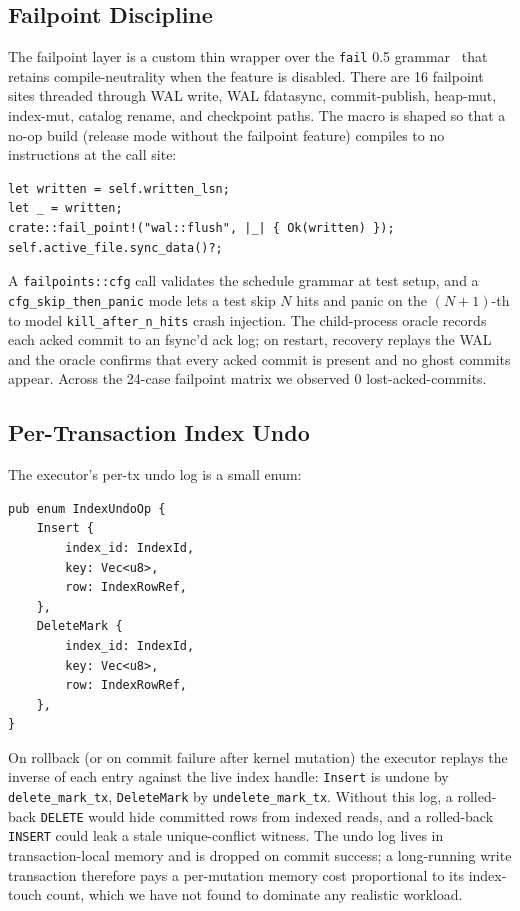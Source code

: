 \subsection{Failpoint Discipline}
The failpoint layer is a custom thin wrapper over the
\texttt{fail} 0.5 grammar~\cite{failrs} that retains
compile-neutrality when the feature is disabled. There are 16
failpoint sites threaded through WAL write, WAL fdatasync,
commit-publish, heap-mut, index-mut, catalog rename, and
checkpoint paths. The macro is shaped so that a no-op build
(release mode without the failpoint feature) compiles to no
instructions at the call site:

\begin{lstlisting}
let written = self.written_lsn;
let _ = written;
crate::fail_point!("wal::flush", |_| { Ok(written) });
self.active_file.sync_data()?;
\end{lstlisting}

A \texttt{failpoints::cfg} call validates the schedule grammar at
test setup, and a \texttt{cfg\_skip\_then\_panic} mode lets a test
skip $N$ hits and panic on the $(N+1)$-th to model
\texttt{kill\_after\_n\_hits} crash injection. The child-process
oracle records each acked commit to an fsync'd ack log; on restart,
recovery replays the WAL and the oracle confirms that every acked
commit is present and no ghost commits appear. Across the 24-case
failpoint matrix we observed 0 lost-acked-commits.

\subsection{Per-Transaction Index Undo}
The executor's per-tx undo log is a small enum:

\begin{lstlisting}
pub enum IndexUndoOp {
    Insert {
        index_id: IndexId,
        key: Vec<u8>,
        row: IndexRowRef,
    },
    DeleteMark {
        index_id: IndexId,
        key: Vec<u8>,
        row: IndexRowRef,
    },
}
\end{lstlisting}

On rollback (or on commit failure after kernel mutation) the executor
replays the inverse of each entry against the live index handle:
\texttt{Insert} is undone by \texttt{delete\_mark\_tx},
\texttt{DeleteMark} by \texttt{undelete\_mark\_tx}. Without this log,
a rolled-back \texttt{DELETE} would hide committed rows from indexed
reads, and a rolled-back \texttt{INSERT} could leak a stale
unique-conflict witness. The undo log lives in transaction-local
memory and is dropped on commit success; a long-running write
transaction therefore pays a per-mutation memory cost proportional
to its index-touch count, which we have not found to dominate any
realistic workload.

